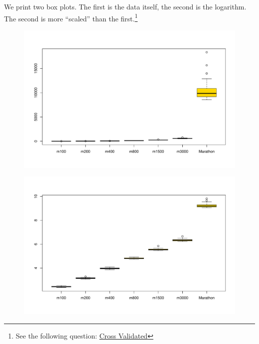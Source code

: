 \documentclass[a4paper]{article}
\newcommand{\dquotes}[1]{``#1''}
\begin{document}
    \noindent
    We print two box plots. The first is the data itself, the second is the logarithm. The second is more \dquotes{scaled} than the first.\footnote{See the following question: \href{https://stats.stackexchange.com/questions/211327/r-box-plot-on-log-scale-vs-log-transforming-then-creating-box-plot-dont-ge}{Cross Validated}}
    
    \begin{figure}[!htp]
        \centering
        \includegraphics[width=\textwidth]{img/visualization-of-multivariate-data-2.pdf}
    \end{figure}
    \begin{figure}[!htp]
        \centering
        \includegraphics[width=\textwidth]{img/visualization-of-multivariate-data-3.pdf}
    \end{figure}

    \newpage
\end{document}
